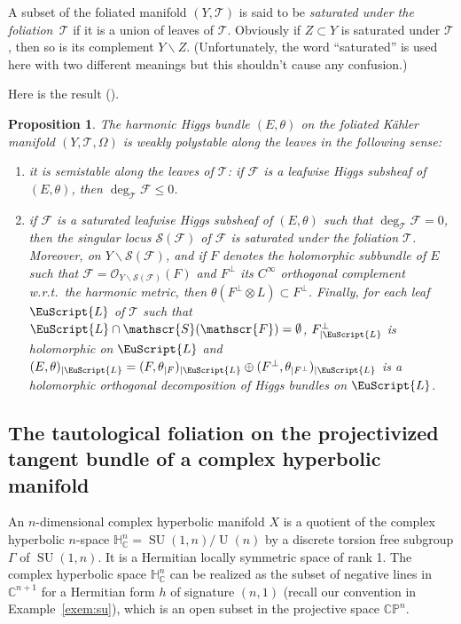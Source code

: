 \documentclass[10pt]{amsart}
\let\mathcal\mathscr
\newcommand{\citestar}[3]{\cite[#3]{#1}}
\newcommand{\Leaf}{\EuScript{L}}
\theoremstyle{plain}
\newtheorem{prop}[theo]{Proposition}
\theoremstyle{definition}
\DeclareMathOperator{\SU}{SU}
\DeclareMathOperator{\rU}{U}
\newcommand{\cF}{\mathcal{F}}
\newcommand{\cO}{\mathcal{O}}
\newcommand{\cS}{\mathcal{S}}
\newcommand{\cT}{\mathcal{T}}
\newcommand{\bC}{\mathbb{C}}
\newcommand{\bCP}{\mathbb{CP}}
\newcommand{\HC}{{\mathbb{H}^n_\mathbb{C}}}
\begin{document}
A subset of the foliated manifold $(Y,\cT)$ is said to be \emph{saturated under the foliation~$\cT$} if it is a
union of leaves of $\cT$. Obviously if $Z\subset Y$ is saturated under $\cT$, then so is its
complement $ Y\backslash Z$.
(Unfortunately, the word ``saturated'' is used here with two different
meanings but this shouldn't cause any confusion.)

Here is the result (\citestar{KM}*{Prop.\,2.2}).

\begin{prop}\label{prop:polystab}
The harmonic Higgs bundle $(E,\theta)$ on the
foliated Kähler manifold $(Y,\cT,\Omega)$ is \emph{weakly polystable along the leaves} in the following sense:
\begin{enumerate}
\item\label{prop:polystab1} it is \emph{semistable along the leaves} of $\cT$: if $\cF$ is a leafwise Higgs
subsheaf of $(E,\theta)$, then $\deg_\cT\cF\leq 0$.
\item\label{prop:polystab2} if $\cF$ is a saturated leafwise Higgs subsheaf of $(E,\theta)$ such that $\deg_\cT\cF=0$, then the
singular locus $\cS(\cF)$ of $\cF$ is saturated under the foliation $\cT$. Moreover, on $Y\backslash
\cS(\cF)$, and if $F$ denotes the holomorphic subbundle of $E$ such that $\cF=\cO_{Y\backslash\cS(\cF)}(F)$ and $F^\perp$ its $C^\infty$
orthogonal complement w.r.t.\ the harmonic metric, then $\theta(F^\perp\otimes L)\subset F^\perp$. Finally,
for each leaf $\Leaf$ of $\cT$ such that $\Leaf\cap\cS(\cF)=\emptyset$, $F^\perp_{|\Leaf}$ is
holomorphic on $\Leaf$
and $(E,\theta)_{|\Leaf}=(F,\theta_{|F})_{|\Leaf}\oplus(F^\perp,\theta_{|F^\perp})_{|\Leaf}$ is a holomorphic
orthogonal decomposition of Higgs bundles on $\Leaf$.
\end{enumerate}
\end{prop}

\subsection{The tautological foliation on the projectivized tangent bundle of a complex hyperbolic
manifold}\label{subsec:toto}

An $n$-dimensional complex hyperbolic manifold $X$ is a quotient of the complex hyperbolic $n$-space
$\HC=\SU(1,n)/\rU(n)$ by a discrete torsion free subgroup $\Gamma$ of $\SU(1,n)$. It is a Hermitian
locally symmetric space of rank 1.
The complex hyperbolic space $\HC$ can be realized as the subset of
negative lines in $\bC^{n+1}$ for a Hermitian form $h$ of signature $(n,1)$
(recall our convention in Example~\ref{exem:su}), which is an open subset in
the projective space $\bCP^n$.\enlargethispage{.5\baselineskip}%
\end{document}
